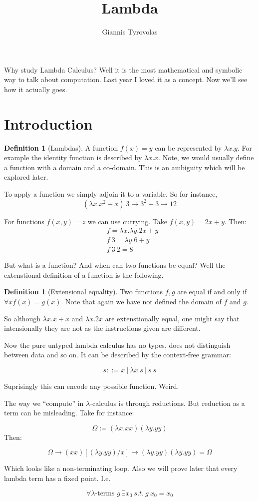 \documentclass[11pt,a4paper]{article}
\title{Lambda}
\author{Giannis Tyrovolas}
\theoremstyle{definition}
\newtheorem{definition}[theorem]{Definition}
\begin{document}
\maketitle


Why study Lambda Calculus? Well it is the most mathematical and symbolic way to talk about computation. Last year I loved it as a concept. Now we'll see how it actually goes.

\section{Introduction}

\begin{definition}[Lambdas]
A function $f(x) = y$ can be represented by $\lambda x.y$. For example the identity function is described by $\lambda x.x$. Note, we would usually define a function with a domain and a co-domain. This is an ambiguity which will be explored later.
\end{definition}

To apply a function we simply adjoin it to a variable. So for instance, 
\[
(\lambda x. x^2 + x) \  3 \rightarrow 3^2 + 3 \rightarrow 12	
\]

For functions $f(x,y) = z$ we can use currying. Take $f(x,y) = 2x + y$. Then:
\begin{align*}
    &f = \lambda x. \lambda y. 2x + y \\
	&f \ 3 = \lambda y. 6 + y \\
	&f \ 3 \ 2 = 8
\end{align*}
	
But what is a function? And when can two functions be equal? Well the extenstional definition of a function is the following.

\begin{definition}[Extensional equality]
Two functions $f, g$ are equal if and only if $\forall x f(x) = g(x)$. Note that again we have not defined the domain of $f$ and $g$. 
\end{definition}

So although $\lambda x. x + x$ and $\lambda x. 2x$ are extenstionally equal, one might say that intensionally they are not as the instructions given are different.

Now the pure untyped lambda calculus has no types, does not distinguish between data and so on. It can be described by the context-free grammar: 

\[
	s ::= x \ | \ \lambda x.s \ | \ s \ s
\]

Suprisingly this can encode any possible function. Weird.

The way we ``compute'' in $\lambda$-calculus is through reductions. But reduction as a term can be misleading. Take for instance:

\[
	\Omega := (\lambda x. xx)(\lambda y. yy)
\]
Then:

\[
	\Omega \rightarrow (xx)[(\lambda y. yy)/x] \rightarrow (\lambda y . yy)(\lambda y . yy) = \Omega
\]

Which looks like a non-terminating loop. Also we will prove later that every lambda term has a fixed point. I.e.

\[
	\forall \lambda\text{-terms } g \  \exists x_0 \ s.t. \  g \ x_0 = x_0 
\]	
\end{document}
